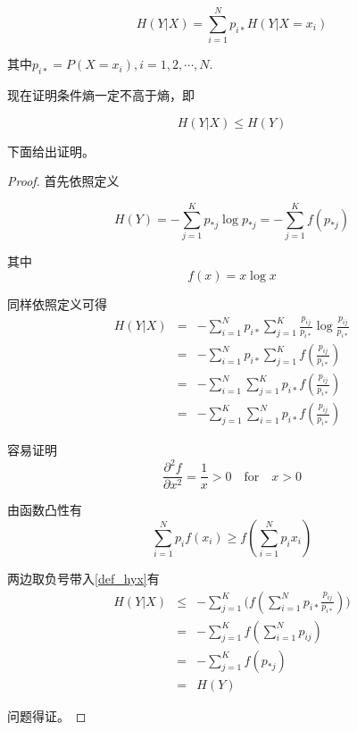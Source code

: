 \begin{equation}
    H(Y|X) = \sum_{i=1}^Np_{i*}H(Y|X=x_i)
\end{equation}

其中$p_{i*} = P(X=x_i),i=1,2,\cdots,N$.

现在证明条件熵一定不高于熵，即

\begin{equation}
    H(Y|X) \leq H(Y)
\end{equation}

下面给出证明。

\begin{proof}
    首先依照定义

    \begin{equation}
        H(Y) = -\sum_{j=1}^Kp_{*j}\log p_{*j} = -\sum_{j=1}^K f(p_{*j})
    \end{equation}

    其中
    \begin{equation*}
        f(x) = x\log x
    \end{equation*}

    同样依照定义可得
    \begin{equation}\label{def_hyx}
        \begin{array}{rcl}
            H(Y|X) & = & -\sum_{i=1}^Np_{i*} \sum_{j=1}^K\frac{p_{ij}}{p_{i*}}\log \frac{p_{ij}}{p_{i*}} \\
                   & = & -\sum_{i=1}^Np_{i*} \sum_{j=1}^Kf(\frac{p_{ij}}{p_{i*}})                        \\
                   & = & -\sum_{i=1}^N\sum_{j=1}^K p_{i*}f(\frac{p_{ij}}{p_{i*}})                        \\
                   & = & -\sum_{j=1}^K\sum_{i=1}^N p_{i*}f(\frac{p_{ij}}{p_{i*}})
        \end{array}
    \end{equation}

    容易证明
    \begin{equation*}
        \frac{\partial^2 f}{\partial x^2} = \frac{1}{x} > 0 \quad \text{for} \quad x > 0
    \end{equation*}

    由函数凸性有
    \begin{equation*}
        \sum_{i=1}^N p_i f(x_i) \geq f(\sum_{i=1}^N p_i x_i)
    \end{equation*}

    两边取负号带入\ref{def_hyx}有
    \begin{equation}
        \begin{array}{rcl}
            H(Y|X) & \leq & -\sum_{j=1}^K\big(f(\sum_{i=1}^N p_{i*} \frac{p_{ij}}{p_{i*}})\big) \\
                   & =    & -\sum_{j=1}^Kf(\sum_{i=1}^Np_{ij})                                  \\
                   & =    & -\sum_{j=1}^Kf(p_{*j})                                              \\
                   & =    & H(Y)
        \end{array}
    \end{equation}

    问题得证。
\end{proof}

